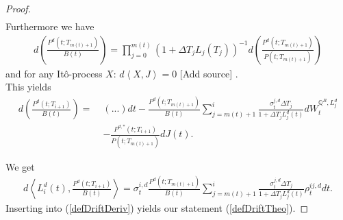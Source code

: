 \documentclass[12pt]{article}
\begin{document}
\begin{proof}
\begin{align*}
		\end{align*}
		Furthermore we have
		\begin{align*}
			d\left(\frac{P^d(t;T_{m(t)+1})}{B(t)}\right) = \prod_{j=0}^{m(t)}(1+\Delta T_j L_j(T_j))^{-1}
			d\left(\frac{P^d(t;T_{m(t)+1})}{P(t;T_{m(t)+1})}\right)
		\end{align*}
		and for any Itô-process $X$: $ d\left\langle X, J\right \rangle = 0$ \color{red}[Add source]\color{black} %
		.\\
		This yields
		\begin{align*}
			d\left(\frac{P^d(t;T_{i+1})}{B(t)}\right) = \;& 
			 (...)dt - \frac{P^d(t;T_{m(t)+1})}{B(t)} \sum_{j=m(t)+1}^{i}\frac{\sigma^{j, d}_t \Delta T_j}{1 + \Delta T_j L^d_j(t)} dW^{\mathbb{Q}^B, L^d_j}_t \\
			 & - \frac{P^{d,*}(t;T_{i + 1})}{P(t;T_{m(t)+1})}dJ(t).
		\end{align*}
		
		We get 
		\begin{align*}
			d\left\langle  L_i^d(t), \frac{P^d(t;T_{i+1})}{B(t)} \right\rangle = \sigma^{i, d}_t \frac{P^d(t;T_{m(t)+1})}{B(t)} \sum_{j=m(t)+1}^{i}\frac{\sigma^{j, d}_t\Delta T_j}{1 + \Delta T_j L^d_j(t)}\rho^{i j, d}_t  dt.
		\end{align*}
		Inserting into (\ref{defDriftDeriv}) yields our statement (\ref{defDriftTheo}).
	\end{proof}
	
\end{document}
